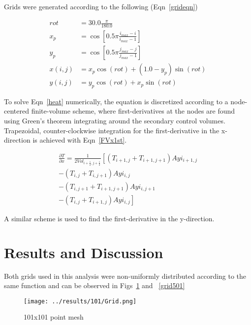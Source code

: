 \documentclass[twocolumn,10pt]{asme2ej}
\begin{document}
\noindent Grids were generated according to the following (Eqn~\ref{grideqn})

\begin{equation}
\begin{split}
   rot &= 30.0 \frac{\pi}{180.0} \\
   x_p &= \cos \left[ 0.5\pi \frac{i_{max}-i}{i_{max}-1} \right] \\
   y_p &= \cos \left[ 0.5\pi \frac{j_{max}-j}{j_{max}-1} \right] \\
x(i,j) &= x_p \cos(rot) + (1.0 - y_p) \sin(rot) \\
y(i,j) &= y_p \cos(rot) + x_p \sin(rot)
\end{split}
\label{grideqn}
\end{equation}

\noindent To solve Eqn~\ref{heat} numerically, the equation is discretized according to a node-centered finite-volume scheme, where first-derivatives at the nodes are found using Green's theorem integrating around the secondary control volumes.  Trapezoidal, counter-clockwise integration for the first-derivative in the x-direction is achieved with Eqn~\ref{FVx1st}.

\begin{equation}
\begin{split}
\frac{\partial T}{\partial x} = \frac{1}{2Vol_{i+\frac{1}{2},j+\frac{1}{2}}}
    \left[ \left(T_{i+1,j} + T_{i+1,j+1} \right)Ayi_{i+1,j} \right. \\
    \left. - \left(T_{i,j} + T_{i,j+1} \right)Ayi_{i,j} \right. \\
    \left. - \left(T_{i,j+1} + T_{i+1,j+1} \right)Ayi_{i,j+1} \right. \\
    \left. - \left(T_{i,j} + T_{i+1,j} \right)Ayi_{i,j} \right]
\end{split}
\label{FVx1st}
\end{equation}

\noindent A similar scheme is used to find the first-derivative in the y-direction.

\section{Results and Discussion}

Both grids used in this analysis were non-uniformly distributed according to the same function and can be observed in Figs~\ref{grid101} and ~\ref{grid501}

\begin{figure}[htb]
\begin{center}
\texttt{[image: ../results/101/Grid.png]}
\caption{101x101 point mesh}
\label{grid101}
\end{center}
\end{figure}
\end{document}
